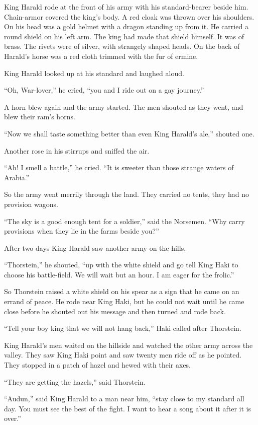King Harald rode at the front of his army with his standard-bearer
beside him. Chain-armor covered the king's body. A red cloak was thrown
over his shoulders. On his head was a gold helmet with a dragon standing
up from it. He carried a round shield on his left arm. The king had made
that shield himself. It was of brass. The rivets were of silver, with
strangely shaped heads. On the back of Harald's horse was a red cloth
trimmed with the fur of ermine.

King Harald looked up at his standard and laughed aloud.

``Oh, War-lover,'' he cried, ``you and I ride out on a gay journey.''

A horn blew again and the army started. The men shouted as they went,
and blew their ram's horns.

``Now we shall taste something better than even King Harald's ale,''
shouted one.

Another rose in his stirrups and sniffed the air.

``Ah! I smell a battle,'' he cried. ``It is sweeter than those strange
waters of Arabia.''

So the army went merrily through the land. They carried no tents, they
had no provision wagons.

``The sky is a good enough tent for a soldier,'' said the Norsemen.
``Why carry provisions when they lie in the farms beside you?''

After two days King Harald saw another army on the hills.

``Thorstein,'' he shouted, ``up with the white shield and go tell King
Haki to choose his battle-field. We will wait but an hour. I am eager
for the frolic.''

So Thorstein raised a white shield on his spear as a sign that he came
on an errand of peace. He rode near King Haki, but he could not wait
until he came close before he shouted out his message and then turned
and rode back.

``Tell your boy king that we will not hang back,'' Haki called after
Thorstein.

King Harald's men waited on the hillside and watched the other army
across the valley. They saw King Haki point and saw twenty men ride off
as he pointed. They stopped in a patch of hazel and hewed with their
axes.

``They are getting the hazels,'' said Thorstein.

``Audun,'' said King Harald to a man near him, ``stay close to my
standard all day. You must see the best of the fight. I want to hear a
song about it after it is over.''

